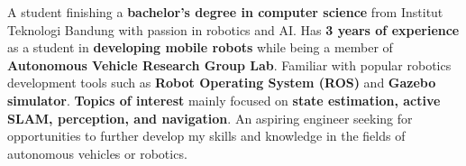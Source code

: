 

\begin{cvparagraph}
A student finishing a \textbf{bachelor's degree in computer science} from Institut Teknologi Bandung with passion in robotics and AI. Has \textbf{3 years of experience} as a student in \textbf{developing mobile robots} while being a member of \textbf{Autonomous Vehicle Research Group Lab}. Familiar with popular robotics development tools such as \textbf{Robot Operating System (ROS)} and \textbf{Gazebo simulator}. \textbf{Topics of interest} mainly focused on \textbf{state estimation, active SLAM, perception, and navigation}. An aspiring engineer seeking for opportunities to further develop my skills and knowledge in the fields of autonomous vehicles or robotics.

\end{cvparagraph}
